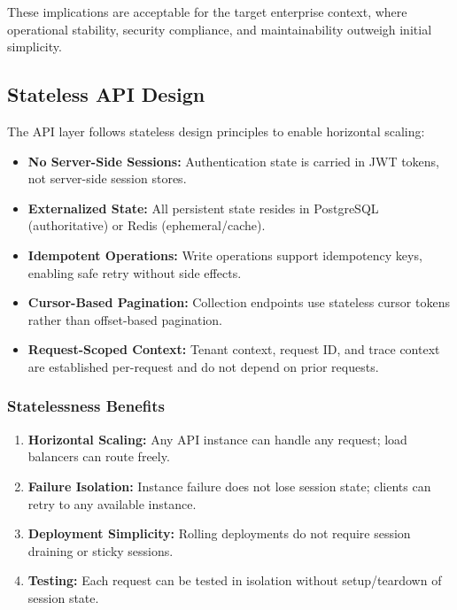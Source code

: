 These implications are acceptable for the target enterprise context, where operational stability, security compliance, and maintainability outweigh initial simplicity.

\subsection{Stateless API Design}
\label{subsec:stateless-api}

The API layer follows stateless design principles to enable horizontal scaling:

\begin{itemize}
    \item \textbf{No Server-Side Sessions:} Authentication state is carried in JWT tokens, not server-side session stores.
    
    \item \textbf{Externalized State:} All persistent state resides in PostgreSQL (authoritative) or Redis (ephemeral/cache).
    
    \item \textbf{Idempotent Operations:} Write operations support idempotency keys, enabling safe retry without side effects.
    
    \item \textbf{Cursor-Based Pagination:} Collection endpoints use stateless cursor tokens rather than offset-based pagination.
    
    \item \textbf{Request-Scoped Context:} Tenant context, request ID, and trace context are established per-request and do not depend on prior requests.
\end{itemize}

\subsubsection{Statelessness Benefits}

\begin{enumerate}
    \item \textbf{Horizontal Scaling:} Any API instance can handle any request; load balancers can route freely.
    
    \item \textbf{Failure Isolation:} Instance failure does not lose session state; clients can retry to any available instance.
    
    \item \textbf{Deployment Simplicity:} Rolling deployments do not require session draining or sticky sessions.
    
    \item \textbf{Testing:} Each request can be tested in isolation without setup/teardown of session state.
\end{enumerate}

